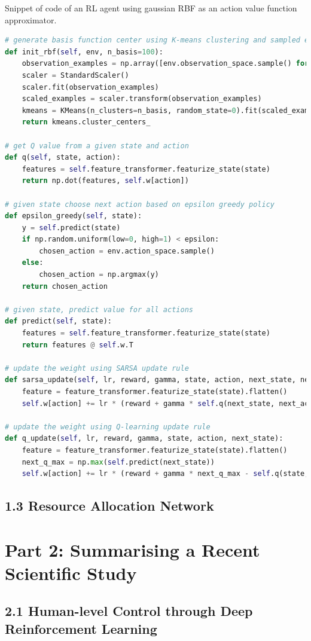 \documentclass[12pt,letterpaper]{article}
\begin{document}
\newpage
Snippet of code of an RL agent using gaussian RBF as an action value function approximator.
\begin{lstlisting}[language=Python]
# generate basis function center using K-means clustering and sampled environment states.
def init_rbf(self, env, n_basis=100):
    observation_examples = np.array([env.observation_space.sample() for x in range(10000)])
    scaler = StandardScaler()
    scaler.fit(observation_examples)
    scaled_examples = scaler.transform(observation_examples)
    kmeans = KMeans(n_clusters=n_basis, random_state=0).fit(scaled_examples)
    return kmeans.cluster_centers_

# get Q value from a given state and action
def q(self, state, action):
    features = self.feature_transformer.featurize_state(state)
    return np.dot(features, self.w[action])

# given state choose next action based on epsilon greedy policy
def epsilon_greedy(self, state):
    y = self.predict(state)
    if np.random.uniform(low=0, high=1) < epsilon:
        chosen_action = env.action_space.sample()
    else:
        chosen_action = np.argmax(y)
    return chosen_action

# given state, predict value for all actions 
def predict(self, state):
    features = self.feature_transformer.featurize_state(state)
    return features @ self.w.T

# update the weight using SARSA update rule
def sarsa_update(self, lr, reward, gamma, state, action, next_state, next_action):
    feature = feature_transformer.featurize_state(state).flatten()
    self.w[action] += lr * (reward + gamma * self.q(next_state, next_action) - self.q(state, action)) * feature

# update the weight using Q-learning update rule
def q_update(self, lr, reward, gamma, state, action, next_state):
    feature = feature_transformer.featurize_state(state).flatten()
    next_q_max = np.max(self.predict(next_state))
    self.w[action] += lr * (reward + gamma * next_q_max - self.q(state, action)) * feature
  \end{lstlisting}

\subsection*{1.3 Resource Allocation Network}



\section*{Part 2: Summarising a Recent Scientific Study}

\subsection*{2.1 Human-level Control through Deep Reinforcement
Learning}
\end{document}
